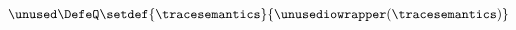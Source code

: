 \begin{eqnarray*}
  \unused\DefeQ
  \setdef{\tracesemantics}{\unusediowrapper(\tracesemantics)}
\end{eqnarray*}

